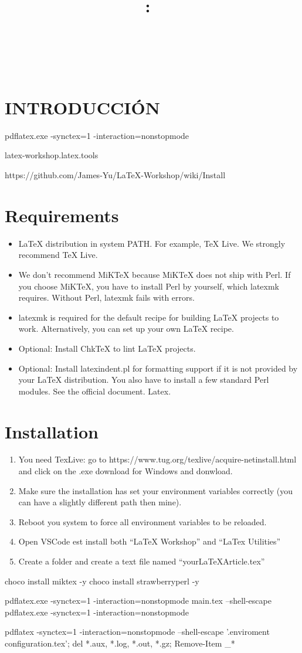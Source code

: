 \documentclass[letterpaper,12pt]{extarticle}
\title{
\centering{\texttt{[image: GN\_logo.png]}}\\
\vspace{2in}
\textmd{\textbf{\hmwkClass:\ \hmwkTitle}}\\
\normalsize\vspace{0.1in}\small{\hmwkDueDate}\\
\vspace{0.1in}\large{\textit{\hmwkClassInstructor\ \hmwkClassTime}}
\vspace{2in}
}
\author{\textbf{\hmwkAuthorName}}
\date{} %
\begin{document}
\section{INTRODUCCIÓN}

pdflatex.exe -synctex=1 -interaction=nonstopmode %

latex-workshop.latex.tools

https://github.com/James-Yu/LaTeX-Workshop/wiki/Install

\section{Requirements}
\begin{itemize}
  \item LaTeX distribution in system PATH. For example, TeX Live. We strongly recommend TeX Live.
  \item We don't recommend MiKTeX because MiKTeX does not ship with Perl. If you choose MiKTeX, you have to install Perl by yourself, which latexmk requires. Without Perl, latexmk fails with errors.
  \item latexmk is required for the default recipe for building LaTeX projects to work. Alternatively, you can set up your own LaTeX recipe.
  \item Optional: Install ChkTeX to lint LaTeX projects.
  \item Optional: Install latexindent.pl for formatting support if it is not provided by your LaTeX distribution. You also have to install a few standard Perl modules. See the official document. Latex.
\end{itemize}

\section{Installation}

\begin{enumerate}
  \item You need TexLive: go to https://www.tug.org/texlive/acquire-netinstall.html and click on the .exe download for Windows and donwload.
  \item Make sure the installation has set your environment variables correctly (you can have a slightly different path then mine).
  \item Reboot you system to force all environment variables to be reloaded.
  \item Open VSCode est install both “LaTeX Workshop” and “LaTex Utilities”
  \item Create a folder and create a text file named “yourLaTeXArticle.tex”
\end{enumerate}

choco install miktex -y
choco install strawberryperl -y

pdflatex.exe -synctex=1 -interaction=nonstopmode main.tex --shell-escape 
pdflatex.exe -synctex=1 -interaction=nonstopmode %

pdflatex -synctex=1 -interaction=nonstopmode --shell-escape '.\Latex enviroment configuration.tex'; del *.aux, *.log, *.out, *.gz; Remove-Item _*
\end{document}
